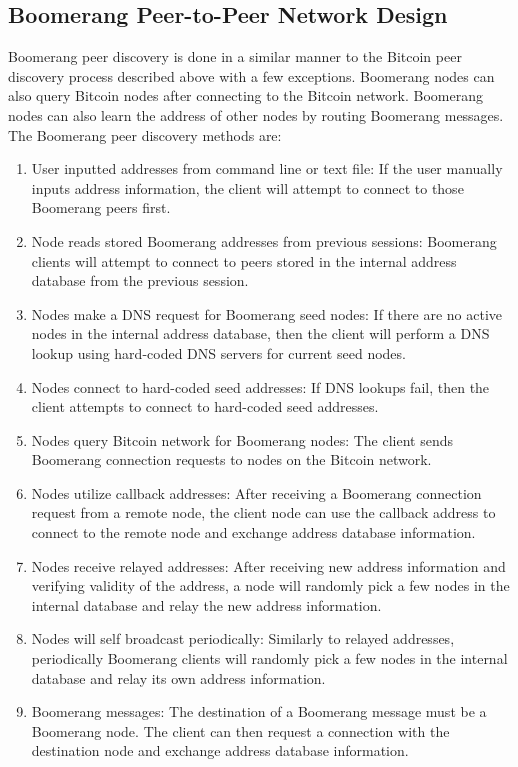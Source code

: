 \subsection{Boomerang Peer-to-Peer Network Design}
Boomerang peer discovery is done in a similar manner to the Bitcoin peer discovery process described above with a few exceptions. Boomerang nodes can also query Bitcoin nodes after connecting to the Bitcoin network. Boomerang nodes can also learn the address of other nodes by routing Boomerang messages. The Boomerang peer discovery methods are:

\begin{enumerate}
	\item User inputted addresses from command line or text file: If the user manually inputs address information, the client will attempt to connect to those Boomerang peers first.
	\item Node reads stored Boomerang addresses from previous sessions: Boomerang clients will attempt to connect to peers stored in the internal address database from the previous session.
	\item Nodes make a DNS request for Boomerang seed nodes: If there are no active nodes in the internal address database, then the client will perform a DNS lookup using hard-coded DNS servers for current seed nodes.
	\item Nodes connect to hard-coded seed addresses: If DNS lookups fail, then the client attempts to connect to hard-coded seed addresses.
	\item Nodes query Bitcoin network for Boomerang nodes: The client sends Boomerang connection requests to nodes on the Bitcoin network.
	\item Nodes utilize callback addresses: After receiving a Boomerang connection request from a remote node, the client node can use the callback address to connect to the remote node and exchange address database information.
	\item Nodes receive relayed addresses: After receiving new address information and verifying validity of the address, a node will randomly pick a few nodes in the internal database and relay the new address information.
	\item Nodes will self broadcast periodically: Similarly to relayed addresses, periodically Boomerang clients will randomly pick a few nodes in the internal database and relay its own address information.
	\item Boomerang messages: The destination of a Boomerang message must be a Boomerang node. The client can then request a connection with the destination node and exchange address database information.
\end{enumerate}

